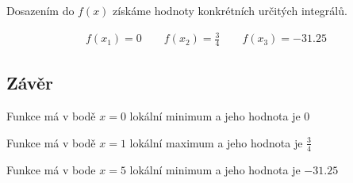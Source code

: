 \noindent Dosazením do \( f(x) \) získáme hodnoty konkrétních určitých integrálů.

\begin{align*}
	f(x_1) = 0 \qquad f(x_2) = \frac{3}{4} \qquad f(x_3) = -31.25
\end{align*}

\subsection*{Závěr}
\noindent Funkce má v bodě $x = 0$ lokální minimum a jeho hodnota je $0$

\noindent Funkce má v bodě $x = 1$ lokální maximum a jeho hodnota je $\frac{3}{4}$

\noindent Funkce má v bode $x = 5$ lokální minimum a jeho hodnota je $-31.25$
